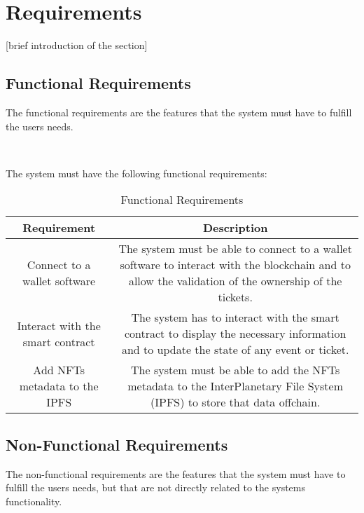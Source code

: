 \section{Requirements}
\label{sec:requirements}

[brief introduction of the section]

\subsection{Functional Requirements}
\label{subsec:functional_requirements}

The functional requirements are the features that the system must have to fulfill the users needs.

~

The system must have the following functional requirements:

\begin{table}[H]
    \caption{Functional Requirements}
    \label{tab:functional_requirements}
    \begin{tabular}{|c|c|}
        \hline
        \textbf{Requirement}             & \textbf{Description}                                                                                                                                 \\
        \hline
        Connect to a wallet software     & The system must be able to connect to a wallet software to interact with the blockchain and to allow the validation of the ownership of the tickets. \\
        \hline
        Interact with the smart contract & The system has to interact with the smart contract to display the necessary information and to update the state of any event or ticket.              \\
        \hline
        Add NFTs metadata to the IPFS    & The system must be able to add the NFTs metadata to the InterPlanetary File System (IPFS) to store that data offchain.                               \\
        \hline
    \end{tabular}
\end{table}


\subsection{Non-Functional Requirements}
\label{subsec:non_functional_requirements}

The non-functional requirements are the features that the system must have to fulfill the users needs, but that are not directly related to the systems functionality.

